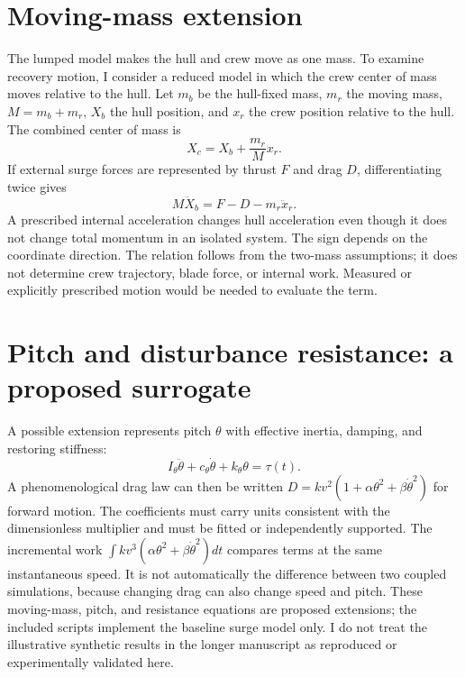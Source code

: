 \documentclass[11pt]{article}
\begin{document}
\section{Moving-mass extension}
The lumped model makes the hull and crew move as one mass. To examine recovery motion, I consider a reduced model in which the crew center of mass moves relative to the hull. Let $m_b$ be the hull-fixed mass, $m_r$ the moving mass, $M=m_b+m_r$, $X_b$ the hull position, and $x_r$ the crew position relative to the hull. The combined center of mass is
\begin{equation}X_c=X_b+\frac{m_r}{M}x_r.\end{equation}
If external surge forces are represented by thrust $F$ and drag $D$, differentiating twice gives
\begin{equation}M\ddot X_b=F-D-m_r\ddot x_r.\end{equation}
A prescribed internal acceleration changes hull acceleration even though it does not change total momentum in an isolated system. The sign depends on the coordinate direction. The relation follows from the two-mass assumptions; it does not determine crew trajectory, blade force, or internal work. Measured or explicitly prescribed motion would be needed to evaluate the term.

\section{Pitch and disturbance resistance: a proposed surrogate}
A possible extension represents pitch $\theta$ with effective inertia, damping, and restoring stiffness:
\begin{equation}I_\theta\ddot\theta+c_\theta\dot\theta+k_\theta\theta=\tau(t).\end{equation}
A phenomenological drag law can then be written $D=kv^2(1+\alpha\theta^2+\beta\dot\theta^2)$ for forward motion. The coefficients must carry units consistent with the dimensionless multiplier and must be fitted or independently supported. The incremental work $\int kv^3(\alpha\theta^2+\beta\dot\theta^2)dt$ compares terms at the same instantaneous speed. It is not automatically the difference between two coupled simulations, because changing drag can also change speed and pitch. These moving-mass, pitch, and resistance equations are proposed extensions; the included scripts implement the baseline surge model only. I do not treat the illustrative synthetic results in the longer manuscript as reproduced or experimentally validated here.
\end{document}
